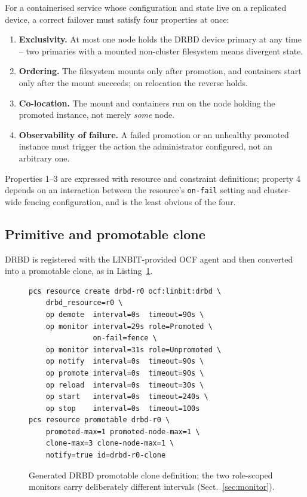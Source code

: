 \documentclass{webofc}
\begin{document}
For a containerised service whose configuration and state live on a
replicated device, a correct failover must satisfy four properties at
once:

\begin{enumerate}
\item \textbf{Exclusivity.} At most one node holds the DRBD device
      primary at any time -- two primaries with a mounted non-cluster
      filesystem means divergent state.
\item \textbf{Ordering.} The filesystem mounts only after promotion, and
      containers start only after the mount succeeds; on relocation the
      reverse holds.
\item \textbf{Co-location.} The mount and containers run on the node
      holding the promoted instance, not merely \emph{some} node.
\item \textbf{Observability of failure.} A failed promotion or an
      unhealthy promoted instance must trigger the action the
      administrator configured, not an arbitrary one.
\end{enumerate}

Properties 1--3 are expressed with resource and constraint definitions;
property 4 depends on an interaction between the resource's
\texttt{on-fail} setting and cluster-wide fencing configuration, and is
the least obvious of the four.

\subsection{Primitive and promotable clone}

DRBD is registered with the LINBIT-provided OCF agent and then converted
into a promotable clone, as in Listing~\ref{lst:drbd}.

\begin{figure}[h]
\begin{scriptsize}
\begin{verbatim}
pcs resource create drbd-r0 ocf:linbit:drbd \
    drbd_resource=r0 \
    op demote  interval=0s  timeout=90s \
    op monitor interval=29s role=Promoted \
               on-fail=fence \
    op monitor interval=31s role=Unpromoted \
    op notify  interval=0s  timeout=90s \
    op promote interval=0s  timeout=90s \
    op reload  interval=0s  timeout=30s \
    op start   interval=0s  timeout=240s \
    op stop    interval=0s  timeout=100s
pcs resource promotable drbd-r0 \
    promoted-max=1 promoted-node-max=1 \
    clone-max=3 clone-node-max=1 \
    notify=true id=drbd-r0-clone
\end{verbatim}
\end{scriptsize}
\caption{Generated DRBD promotable clone definition; the two role-scoped
monitors carry deliberately different intervals (Sect.~\ref{sec:monitor}).}
\label{lst:drbd}
\end{figure}
\end{document}
